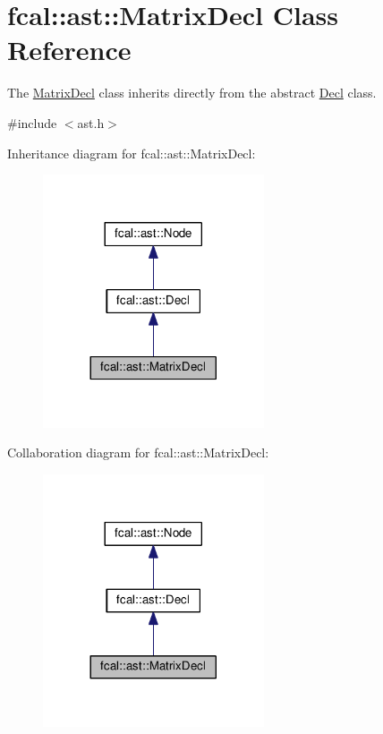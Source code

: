 \hypertarget{classfcal_1_1ast_1_1MatrixDecl}{}\section{fcal\+:\+:ast\+:\+:Matrix\+Decl Class Reference}
\label{classfcal_1_1ast_1_1MatrixDecl}


The \hyperlink{classfcal_1_1ast_1_1MatrixDecl}{Matrix\+Decl} class inherits directly from the abstract \hyperlink{classfcal_1_1ast_1_1Decl}{Decl} class.  




{\ttfamily \#include $<$ast.\+h$>$}



Inheritance diagram for fcal\+:\+:ast\+:\+:Matrix\+Decl\+:
\nopagebreak
\begin{figure}[H]
\begin{center}
\leavevmode
\includegraphics[width=185pt]{classfcal_1_1ast_1_1MatrixDecl__inherit__graph}
\end{center}
\end{figure}


Collaboration diagram for fcal\+:\+:ast\+:\+:Matrix\+Decl\+:
\nopagebreak
\begin{figure}[H]
\begin{center}
\leavevmode
\includegraphics[width=185pt]{classfcal_1_1ast_1_1MatrixDecl__coll__graph}
\end{center}
\end{figure}
